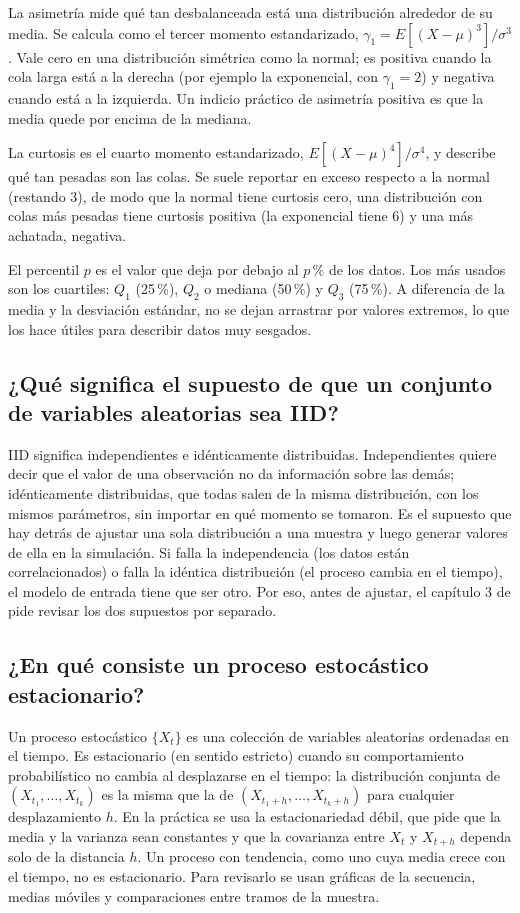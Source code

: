 \documentclass[11pt,letterpaper]{article}
\begin{document}
La asimetría mide qué tan desbalanceada está una distribución alrededor de su media. Se calcula como el tercer
momento estandarizado, $\gamma_1 = E[(X - \mu)^3]/\sigma^3$. Vale cero en una distribución simétrica como la normal;
es positiva cuando la cola larga está a la derecha (por ejemplo la exponencial, con $\gamma_1 = 2$) y negativa
cuando está a la izquierda. Un indicio práctico de asimetría positiva es que la media quede por encima de la mediana.

La curtosis es el cuarto momento estandarizado, $E[(X - \mu)^4]/\sigma^4$, y describe qué tan pesadas son las colas.
Se suele reportar en exceso respecto a la normal (restando 3), de modo que la normal tiene curtosis cero, una
distribución con colas más pesadas tiene curtosis positiva (la exponencial tiene 6) y una más achatada, negativa.

El percentil $p$ es el valor que deja por debajo al $p\,\%$ de los datos. Los más usados son los cuartiles:
$Q_1$ (25\,\%), $Q_2$ o mediana (50\,\%) y $Q_3$ (75\,\%). A diferencia de la media y la desviación estándar, no se
dejan arrastrar por valores extremos, lo que los hace útiles para describir datos muy sesgados.

\subsection{¿Qué significa el supuesto de que un conjunto de variables aleatorias sea IID?}

IID significa independientes e idénticamente distribuidas. Independientes quiere decir que el valor de una
observación no da información sobre las demás; idénticamente distribuidas, que todas salen de la misma
distribución, con los mismos parámetros, sin importar en qué momento se tomaron. Es el supuesto que hay detrás de
ajustar una sola distribución a una muestra y luego generar valores de ella en la simulación. Si falla la
independencia (los datos están correlacionados) o falla la idéntica distribución (el proceso cambia en el tiempo),
el modelo de entrada tiene que ser otro. Por eso, antes de ajustar, el capítulo 3 de \cite{banks98} pide revisar
los dos supuestos por separado.

\subsection{¿En qué consiste un proceso estocástico estacionario?}

Un proceso estocástico $\{X_t\}$ es una colección de variables aleatorias ordenadas en el tiempo. Es estacionario
(en sentido estricto) cuando su comportamiento probabilístico no cambia al desplazarse en el tiempo: la
distribución conjunta de $(X_{t_1}, \dots, X_{t_k})$ es la misma que la de $(X_{t_1+h}, \dots, X_{t_k+h})$ para
cualquier desplazamiento $h$. En la práctica se usa la estacionariedad débil, que pide que la media y la varianza
sean constantes y que la covarianza entre $X_t$ y $X_{t+h}$ dependa solo de la distancia $h$. Un proceso con
tendencia, como uno cuya media crece con el tiempo, no es estacionario. Para revisarlo se usan gráficas de la
secuencia, medias móviles y comparaciones entre tramos de la muestra.
\end{document}

